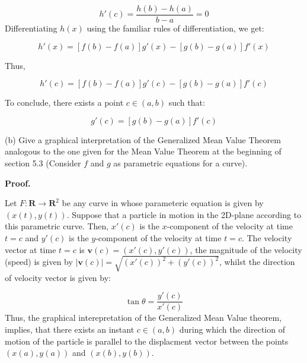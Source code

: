 \documentclass[10pt]{article}
\begin{document}
\begin{equation*}
h'( c) =\frac{h( b) -h( a)}{b-a} =0
\end{equation*}
Differentiating $\displaystyle h( x)$ using the familiar rules of differentiation, we get:




\begin{equation*}
h'( x) =[ f( b) -f( a)] g'( x) -[ g( b) -g( a)] f'( x)
\end{equation*}


Thus, 


\begin{equation*}
h'( c) =[ f( b) -f( a)] g'( c) -[ g( b) -g( a)] f'( c)
\end{equation*}


To conclude, there exists a point $\displaystyle c\in ( a,b)$ such that:


\begin{equation*}
[ f( b) -f( a)] g'( c) =[ g( b) -g( a)] f'( c)
\end{equation*}


(b) Give a graphical interpretation of the Generalized Mean Value Theorem analogous to the one given for the Mean Value Theorem at the beginning of section 5.3 (Consider $\displaystyle f$ and $\displaystyle g$ as parametric equations for a curve).



\textbf{Proof.}



Let $\displaystyle F:\mathbf{R}\rightarrow \mathbf{R}^{2}$ be any curve in whose parameteric equation is given by $\displaystyle ( x( t) ,y( t))$. Suppose that a particle in motion in the 2D-plane according to this parametric curve. Then, $\displaystyle x'( c)$ is the $\displaystyle x$-component of the velocity at time $\displaystyle t=c$ and $\displaystyle y'( c)$ is the $\displaystyle y$-component of the velocity at time $\displaystyle t=c$. The velocity vector at time $\displaystyle t=c$ is $\displaystyle \mathbf{v}( c) =( x'( c) ,y'( c))$, the magnitude of the velocity (speed) is given by $\displaystyle | \mathbf{v}( c)| =\sqrt{( x'( c))^{2} +( y'( c))^{2}}$, whilst the direction of velocity vector is given by:


\begin{equation*}
\tan \theta =\frac{y'( c)}{x'( c)}
\end{equation*}
Thus, the graphical interepretation of the Generalized Mean Value theorem, implies, that there exists an instant $\displaystyle c\in ( a,b)$ during which the direction of motion of the particle is parallel to the displacment vector between the points $\displaystyle ( x( a) ,y( a))$ and $\displaystyle ( x( b) ,y( b))$.
\end{document}
